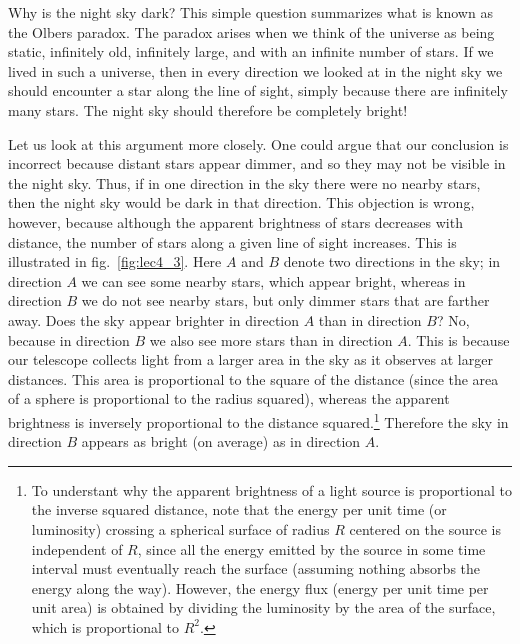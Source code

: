 \documentclass[11pt, a4paper,oneside,openright]{book}
\numberwithin{equation}{section}
\begin{document}
Why is the night sky dark? This simple question summarizes what is known as the Olbers paradox. The paradox arises when we think of the universe as being static, infinitely old, infinitely large, and with an infinite number of stars. If we lived in such a universe, then in every direction we looked at in the night sky we should encounter a star along the line of sight, simply because there are infinitely many stars. The night sky should therefore be completely bright!

Let us look at this argument more closely. One could argue that our conclusion is incorrect because distant stars appear dimmer, and so they may not be visible in the night sky. Thus, if in one direction in the sky there were no nearby stars, then the night sky would be dark in that direction. This objection is wrong, however, because although the apparent brightness of stars decreases with distance, the number of stars along a given line of sight increases. This is illustrated in fig.\ \ref{fig:lec4_3}. Here $A$ and $B$ denote two directions in the sky; in direction $A$ we can see some nearby stars, which appear bright, whereas in direction $B$ we do not see nearby stars, but only dimmer stars that are farther away. Does the sky appear brighter in direction $A$ than in direction $B$? No, because in direction $B$ we also see more stars than in direction $A$. This is because our telescope collects light from a larger area in the sky as it observes at larger distances. This area is proportional to the square 
of the distance (since the area of a sphere is proportional to the radius squared), whereas the apparent brightness is inversely proportional to the distance squared.\footnote{To understant why the apparent brightness of a light source is proportional to the inverse squared distance, note that the energy per unit time (or luminosity) crossing a spherical surface of radius $R$ centered on the source is independent of $R$, since all the energy emitted by the source in some time interval must eventually reach the surface (assuming nothing absorbs the energy along the way). However, the energy flux (energy per unit time per unit area) is obtained by dividing the luminosity by the area of the surface, which is proportional to $R^2$.} Therefore the sky in direction $B$ appears as bright (on average) as in direction $A$.
\end{document}
